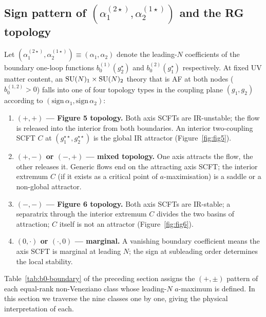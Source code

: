
\subsection{Sign pattern of
  \texorpdfstring{$(\alpha_{1}^{(2\star)},\alpha_{2}^{(1\star)})$}{(alpha_1,alpha_2)}
  and the RG topology}
\label{sec:phases-topology}

Let
$(\alpha_{1}^{(2\star)},\alpha_{2}^{(1\star)})\equiv(\alpha_{1},\alpha_{2})$
denote the leading-$N$ coefficients of the boundary one-loop
functions $b_{0}^{(1)}(g_{2}^{\star})$ and
$b_{0}^{(2)}(g_{1}^{\star})$ respectively.  At fixed UV matter
content, an $\mathrm{SU}(N)_{1}\times\mathrm{SU}(N)_{2}$ theory that is AF at both
nodes ($b_{0}^{(1,2)}>0$) falls into one of four topology types in
the coupling plane $(g_{1},g_{2})$ according to
$(\text{sign}\,\alpha_{1},\text{sign}\,\alpha_{2})$:
\begin{enumerate}\setlength{\itemsep}{4pt}
  \item \textbf{$(+,+)$ — Figure 5 topology.}  Both axis SCFTs are
    IR-unstable; the flow is released into the interior from both
    boundaries.  An interior two-coupling SCFT $C$ at
    $(g_{1}^{\star\star},g_{2}^{\star\star})$ is the global IR
    attractor (Figure~\ref{fig:fig5}).
  \item \textbf{$(+,-)$ or $(-,+)$ — mixed topology.}  One axis
    attracts the flow, the other releases it.  Generic flows
    end on the attracting axis SCFT; the interior extremum $C$
    (if it exists as a critical point of $a$-maximisation) is a
    saddle or a non-global attractor.
  \item \textbf{$(-,-)$ — Figure 6 topology.}  Both axis SCFTs are
    IR-stable; a separatrix through the interior extremum $C$
    divides the two basins of attraction; $C$ itself is not an
    attractor (Figure~\ref{fig:fig6}).
  \item \textbf{$(0,\cdot)$ or $(\cdot,0)$ — marginal.}  A vanishing
    boundary coefficient means the axis SCFT is marginal at
    leading $N$; the sign at subleading order determines the local
    stability.
\end{enumerate}

Table~\ref{tab:b0-boundary} of the preceding section assigns the
$(+,\pm)$ pattern of each equal-rank non-Veneziano class whose
leading-$N$ $a$-maximum is defined.  In this section we traverse the
nine classes one by one, giving the physical interpretation of each.

